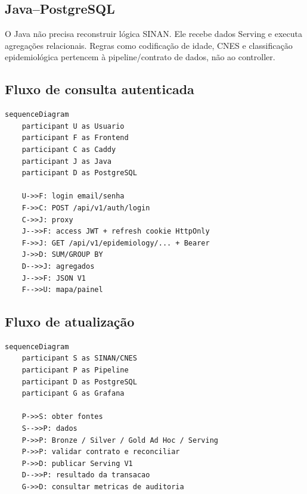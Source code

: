 \subsection{Java--PostgreSQL}

O Java não precisa reconstruir lógica SINAN. Ele recebe dados Serving e executa agregações relacionais. Regras como codificação de idade, CNES e classificação epidemiológica pertencem à pipeline/contrato de dados, não ao controller.

\subsection{Fluxo de consulta autenticada}

\begin{lstlisting}[language=Mermaid]
sequenceDiagram
    participant U as Usuario
    participant F as Frontend
    participant C as Caddy
    participant J as Java
    participant D as PostgreSQL

    U->>F: login email/senha
    F->>C: POST /api/v1/auth/login
    C->>J: proxy
    J-->>F: access JWT + refresh cookie HttpOnly
    F->>J: GET /api/v1/epidemiology/... + Bearer
    J->>D: SUM/GROUP BY
    D-->>J: agregados
    J-->>F: JSON V1
    F-->>U: mapa/painel
\end{lstlisting}

\subsection{Fluxo de atualização}

\begin{lstlisting}[language=Mermaid]
sequenceDiagram
    participant S as SINAN/CNES
    participant P as Pipeline
    participant D as PostgreSQL
    participant G as Grafana

    P->>S: obter fontes
    S-->>P: dados
    P->>P: Bronze / Silver / Gold Ad Hoc / Serving
    P->>P: validar contrato e reconciliar
    P->>D: publicar Serving V1
    D-->>P: resultado da transacao
    G->>D: consultar metricas de auditoria
\end{lstlisting}

